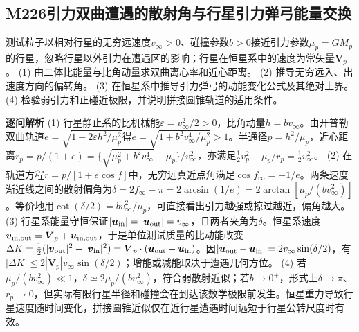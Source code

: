 \subsection*{M226\quad 引力双曲遭遇的散射角与行星引力弹弓能量交换}
测试粒子以相对行星的无穷远速度$v_\infty>0$、碰撞参数$b>0$接近引力参数$\mu_p=GM_p$的行星，忽略行星以外引力在遭遇区的影响；行星在恒星系中的速度为常矢量$\boldsymbol V_p$。
(1) 由二体比能量与比角动量求双曲离心率和近心距离。
(2) 推导无穷远入、出速度方向的偏转角。
(3) 在恒星系中推导引力弹弓的动能变化公式及其绝对上界。
(4) 检验弱引力和正碰近极限，并说明拼接圆锥轨道的适用条件。
\par\textbf{逐问解析}
(1) 行星静止系的比机械能$\varepsilon=v_\infty^2/2>0$，比角动量$h=bv_\infty$。由开普勒双曲轨道$e=\sqrt{1+2\varepsilon h^2/\mu_p^2}$得$e=\sqrt{1+b^2v_\infty^4/\mu_p^2}>1$。半通径$p=h^2/\mu_p$，近心距离$r_p=p/(1+e)=\{\sqrt{\mu_p^2+b^2v_\infty^4}-\mu_p\}/v_\infty^2$，亦满足$\frac12v_p^2-\mu_p/r_p=\frac12v_\infty^2$。
(2) 在轨道方程$r=p/[1+e\cos f]$中，无穷远真近点角满足$\cos f_\infty=-1/e$。两条速度渐近线之间的散射偏角为$\delta=2f_\infty-\pi=2\arcsin(1/e)=2\arctan[\mu_p/(bv_\infty^2)]$。等价地用$\cot(\delta/2)=bv_\infty^2/\mu_p$，可直接看出引力越强或掠过越近，偏角越大。
(3) 行星系能量守恒保证$|\boldsymbol u_{\rm in}|=|\boldsymbol u_{\rm out}|=v_\infty$，且两者夹角为$\delta$。恒星系速度$\boldsymbol v_{\rm in,out}=\boldsymbol V_p+\boldsymbol u_{\rm in,out}$，于是单位测试质量的比动能改变$\Delta K=\frac12(|\boldsymbol v_{\rm out}|^2-|\boldsymbol v_{\rm in}|^2)=\boldsymbol V_p\cdot(\boldsymbol u_{\rm out}-\boldsymbol u_{\rm in})$。因$|\boldsymbol u_{\rm out}-\boldsymbol u_{\rm in}|=2v_\infty\sin(\delta/2)$，有$|\Delta K|\le2|\boldsymbol V_p|v_\infty\sin(\delta/2)$；增能或减能取决于遭遇几何方位。
(4) 若$\mu_p/(bv_\infty^2)\ll1$，$\delta\simeq2\mu_p/(bv_\infty^2)$，符合弱散射近似；若$b\to0^+$，形式上$\delta\to\pi$、$r_p\to0$，但实际有限行星半径和碰撞会在到达该数学极限前发生。恒星重力导致行星速度随时间变化，拼接圆锥近似仅在近行星遭遇时间远短于行星公转尺度时有效。
\par\medskip
